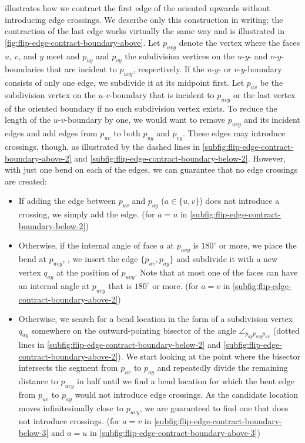 illustrates how we contract the first edge of the oriented upwards without introducing edge crossings.
We describe only this construction in writing; the contraction of the last edge works virtually the same way and is illustrated in \cref{fig:flip-edge-contract-boundary-above}.
Let $p_{uvy}$ denote the vertex where the faces $u$, $v$, and $y$ meet and $p_{uy}$ and $p_{vy}$ the subdivision vertices on the $u$-$y$- and $v$-$y$-boundaries that are incident to $p_{uvy}$, respectively.
If the $u$-$y$- or $v$-$y$-boundary consists of only one edge, we subdivide it at its midpoint first.
Let $p_{uv}$ be the subdivision vertex on the $u$-$v$-boundary that is incident to $p_{uvy}$ or the last vertex of the oriented boundary if no such subdivision vertex exists.
To reduce the length of the $u$-$v$-boundary by one, we would want to remove $p_{uvy}$ and its incident edges and add edges from $p_{uv}$ to both $p_{uy}$ and $p_{vy}$.
These edges may introduce crossings, though, as illustrated by the dashed lines in \cref{subfig:flip-edge-contract-boundary-above-2} and \cref{subfig:flip-edge-contract-boundary-below-2}.
However, with just one bend on each of the edges, we can guarantee that no edge crossings are created:

\begin{itemize}
\item If adding the edge between $p_{uv}$ and $p_{ay}$ ($a \in \{u,v\}$) does not introduce a crossing, we simply add the edge.
(for $a = u$ in \cref{subfig:flip-edge-contract-boundary-below-2})
\item Otherwise, if the internal angle of face $a$ at $p_{uvy}$ is $180^\circ$ or more, we place the bend at $p_{uvy}$, \ie{}, we insert the edge $\{p_{uv},p_{ay}\}$ and subdivide it with a new vertex $q_{ay}$ at the position of $p_{uvy}$.
Note that at most one of the faces can have an internal angle at $p_{uvy}$ that is $180^\circ$ or more.
(for $a = v$ in \cref{subfig:flip-edge-contract-boundary-above-2})
\item Otherwise, we search for a bend location in the form of a subdivision vertex $q_{ay}$ somewhere on the outward-pointing bisector of the angle $\angle_{p_{ay}p_{uvy}p_{uv}}$ (dotted lines in \cref{subfig:flip-edge-contract-boundary-below-2} and \cref{subfig:flip-edge-contract-boundary-above-2}).
We start looking at the point where the bisector intersects the segment from $p_{uv}$ to $p_{ay}$ and repeatedly divide the remaining distance to $p_{uvy}$ in half until we find a bend location for which the bent edge from $p_{uv}$ to $p_{ay}$ would not introduce edge crossings.
As the candidate location moves infinitesimally close to $p_{uvy}$, we are guaranteed to find one that does not introduce crossings.
(for $a = v$ in \cref{subfig:flip-edge-contract-boundary-below-3} and $a = u$ in \cref{subfig:flip-edge-contract-boundary-above-3})
\end{itemize}


